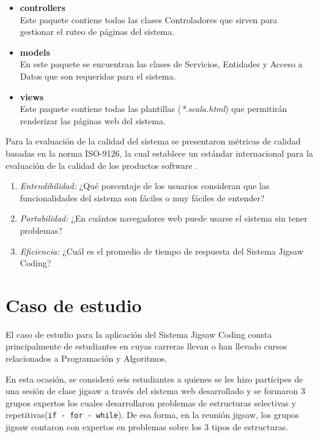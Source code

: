 \documentclass[twoside]{article}
\begin{document}
\begin{multicols}{2}
\begin{itemize}
	\item \textbf{controllers}\\Este paquete contiene todas las clases Controladores que sirven para gestionar el ruteo de páginas del sistema.
	\item \textbf{models}\\En este paquete se encuentran las clases de Servicios, Entidades y Acceso a Datos que son requeridas para el sistema.
	\item \textbf{views}\\Este paquete contiene todas las plantillas (\emph{*.scala.html}) que permitirán renderizar las páginas web del sistema.
\end{itemize}

Para la evaluación de la calidad del sistema se presentaron métricas de calidad basadas en la norma ISO-9126, la cual establece un estándar internacional para la evaluación de la calidad de los productos software \cite{iso9126-3}.

\begin{enumerate}
	\item \emph{Entendibilidad:} ¿Qué porcentaje de los usuarios consideran que las funcionalidades del sistema son fáciles o muy fáciles de entender? \\ 
	\item \emph{Portabilidad:} ¿En cuántos navegadores web puede usarse el sistema sin tener problemas?  \\ 
	\item \emph{Eficiencia:} ¿Cuál es el promedio de tiempo de respuesta del Sistema Jigsaw Coding?\\
\end{enumerate}

	
\section{Caso de estudio}
El caso de estudio para la aplicación del Sistema Jigsaw Coding consta principalmente de estudiantes en cuyas carreras llevan o han llevado cursos relacionados a Programación y Algoritmos. 

En esta ocasión, se consideró seis estudiantes a quienes se les hizo partícipes de una sesión de clase jigsaw a través del sistema web desarrollado y se formaron 3 grupos expertos los cuales desarrollaron problemas de estructuras selectivas y repetitivas(\texttt{if - for - while}). De esa forma, en la reunión jigsaw, los grupos jigsaw contaron con expertos en problemas sobre los 3 tipos de estructuras.


\end{multicols}
\end{document}

